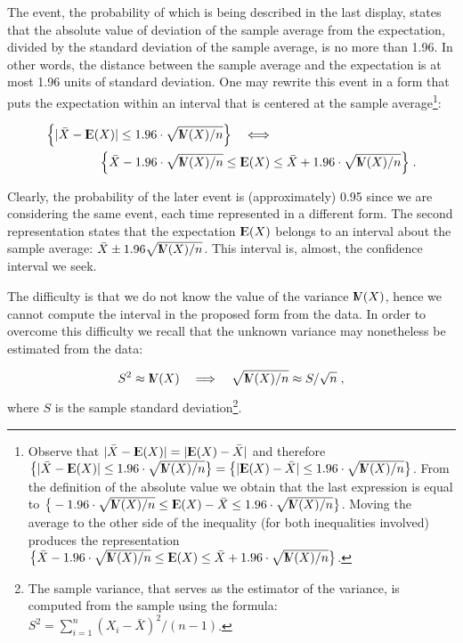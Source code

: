 \documentclass[]{krantz}
\newcommand{\Expec}{{\rm I\kern-.3em E}}
\newcommand{\Var}{{\rm I\kern-.3em V}}
\theoremstyle{definition}
\theoremstyle{definition}
\theoremstyle{definition}
\theoremstyle{remark}
\begin{document}
The event, the probability of which is being described in the last
display, states that the absolute value of deviation of the sample
average from the expectation, divided by the standard deviation of the
sample average, is no more than 1.96. In other words, the distance
between the sample average and the expectation is at most 1.96 units of
standard deviation. One may rewrite this event in a form that puts the
expectation within an interval that is centered at the sample
average\footnote{Observe that
  \(|\bar X - \Expec(X)| = |\Expec(X) -\bar X |\) and therefore
  \(\big\{|\bar X - \Expec(X)| \leq 1.96 \cdot \sqrt{\Var(X)/n} \big\} =\big\{| \Expec(X)-\bar X | \leq 1.96 \cdot \sqrt{\Var(X)/n} \big\}\).
  From the definition of the absolute value we obtain that the last
  expression is equal to
  \(\big\{-1.96 \cdot \sqrt{\Var(X)/n} \leq \Expec(X)-\bar X \leq 1.96 \cdot \sqrt{\Var(X)/n} \big\}\).
  Moving the average to the other side of the inequality (for both
  inequalities involved) produces the representation
  \(\big\{\bar X-1.96 \cdot \sqrt{\Var(X)/n} \leq \Expec(X)\leq \bar X + 1.96 \cdot \sqrt{\Var(X)/n} \big\}\).}:

\[\begin{aligned}
\Big\{|\bar X - \Expec(X)| \leq 1.96 \cdot \sqrt{\Var(X)/n} \Big\} \quad \Longleftrightarrow & \\
 \Big\{ \bar X -1.96 \cdot\sqrt{\Var(X)/n} \leq  \Expec(X) &\leq \bar X + 1.96 \cdot \sqrt{\Var(X)/n}\Big\}\;.\end{aligned}\]

Clearly, the probability of the later event is (approximately) 0.95
since we are considering the same event, each time represented in a
different form. The second representation states that the expectation
\(\Expec(X)\) belongs to an interval about the sample average:
\(\bar X \pm 1.96 \sqrt{\Var(X)/n}\). This interval is, almost, the
confidence interval we seek.

The difficulty is that we do not know the value of the variance
\(\Var(X)\), hence we cannot compute the interval in the proposed form
from the data. In order to overcome this difficulty we recall that the
unknown variance may nonetheless be estimated from the data:

\[S^2 \approx \Var(X) \quad \Longrightarrow \quad \sqrt{\Var(X)/n} \approx S/\sqrt{n}\;,\]
where \(S\) is the sample standard deviation\footnote{The sample
  variance, that serves as the estimator of the variance, is computed
  from the sample using the formula:
  \(S^2 = \sum_{i=1}^n (X_i-\bar X)^2/(n-1)\).}.
\end{document}
